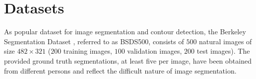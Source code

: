 \documentclass[runningheads]{llncs}
\makeatletter
\DeclareRobustCommand\onedot{\futurelet\@let@token\@onedot}
\def\@onedot{\ifx\@let@token.\else.\null\fi\xspace}
\def\etal{{et al}\onedot}
\makeatother
\begin{document}
    \vspace{-1mm}
    \section{Datasets}
    \vspace{-0.5mm}
    \label{sec:datasets}
    
    As popular dataset for image segmentation and contour detection, the Berkeley Segmentation Dataset \cite{ArbelaezMaireFowlkesMalik:2011}, referred to as BSDS500, consists of $500$ natural images of size $482 \times 321$ ($200$ training images, $100$ validation images, $200$ test images). The provided ground truth segmentations, at least five per image, have been obtained from different persons and reflect the difficult nature of image segmentation.
    
\end{document}
